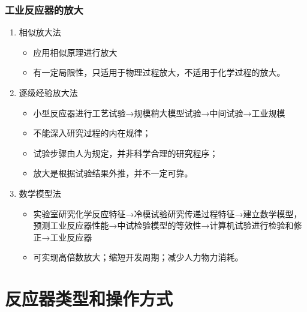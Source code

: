 \documentclass[dvipsnames, svgnames, x11names]{beamer}
\begin{document}
\begin{frame}
    \frametitle{工业反应器的放大}
    \begin{enumerate}
      \item 相似放大法
        \begin{itemize}
          \item 应用相似原理进行放大
          \item 有一定局限性，只适用于物理过程放大，不适用于化学过程的放大。
        \end{itemize}
      \item 逐级经验放大法
        \begin{itemize}
          \item 小型反应器进行工艺试验→规模稍大模型试验→中间试验→工业规模
          \item 不能深入研究过程的内在规律；
          \item 试验步骤由人为规定，并非科学合理的研究程序；
          \item 放大是根据试验结果外推，并不一定可靠。
        \end{itemize}
      \item 数学模型法
        \begin{itemize}
          \item 实验室研究化学反应特征→冷模试验研究传递过程特征→建立数学模型，预测工业反应器性能→中试检验模型的等效性→计算机试验进行检验和修正→工业反应器
          \item 可实现高倍数放大；缩短开发周期；减少人力物力消耗。
        \end{itemize}
    \end{enumerate}
\end{frame}




\section{反应器类型和操作方式}
\end{document}
